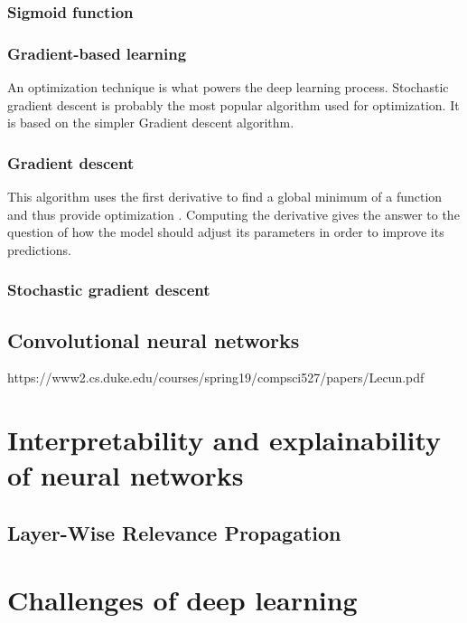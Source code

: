 \subsubsection*{Sigmoid function}
\subsubsection{Gradient-based learning}
An optimization technique is what powers the deep learning process. Stochastic gradient descent is probably the most popular algorithm used for optimization. It is based on the simpler Gradient descent algorithm.
\subsubsection*{Gradient descent}
This algorithm uses the first derivative to find a global minimum of a function and thus provide optimization \cite{deeplearningbook}. Computing the derivative gives the answer to the question of how the model should adjust its parameters in order to improve its predictions.

\subsubsection*{Stochastic gradient descent}
\subsection{Convolutional neural networks}

https://www2.cs.duke.edu/courses/spring19/compsci527/papers/Lecun.pdf
\section{Interpretability and explainability of neural networks}
\subsection{Layer-Wise Relevance Propagation}
\section{Challenges of deep learning}